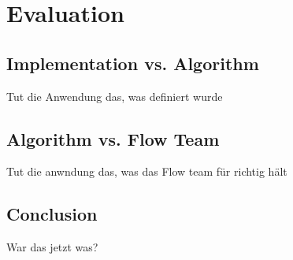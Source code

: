 \chapter{Evaluation}

\section{Implementation vs. Algorithm}
Tut die Anwendung das, was definiert wurde

\section{Algorithm vs. Flow Team}
Tut die anwndung das, was das Flow team für richtig hält

\section{Conclusion}
War das jetzt was?
